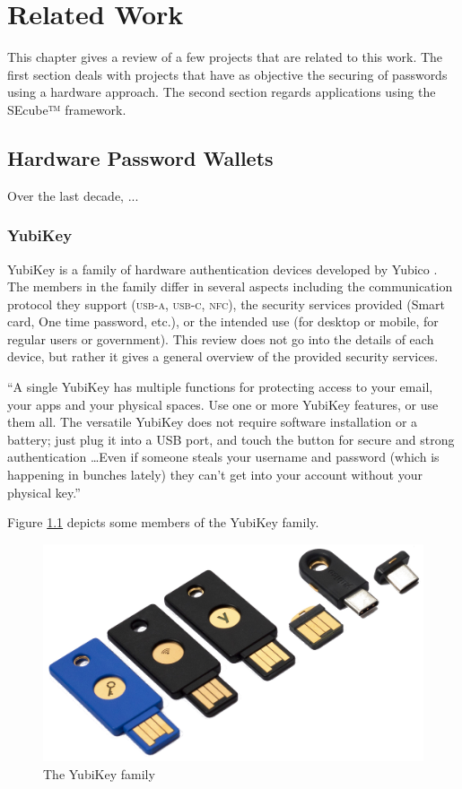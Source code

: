 \chapter{Related Work} \label{chap:related}

This chapter gives a review of a few projects that are related to this work. The first section deals with projects that have as objective the securing of passwords using a hardware approach. The second section regards applications using the SEcube™ framework.

\section {Hardware Password Wallets}
Over the last decade, ... 


\subsection{YubiKey}

YubiKey is a family of hardware authentication devices developed by Yubico \cite{yubi}. The members in the family differ in several aspects including the communication protocol they support (\textsc{usb-a}, \textsc{usb-c}, \textsc{nfc}), the security services provided (Smart card, One time password, etc.), or the intended use (for desktop or mobile, for regular users or government). This review does not go into the details of each device, but rather it gives a general overview of the provided security services. 

``A single YubiKey has multiple functions for protecting access to your email, your apps and your physical spaces. Use one or more YubiKey features, or use them all. The versatile YubiKey does not require software installation or a battery; just plug it into a USB port, and touch the button for secure and strong authentication \ldots  Even if someone steals your username and password (which is happening in bunches lately) they can’t get into your account without your physical key.''\cite{yubiworks}

Figure \ref{fig:yubi} depicts some members of the YubiKey family.

\begin{figure}[htb]
  \centering
  \captionsetup{justification=centering}
  \centerline{\includegraphics[width=0.8\columnwidth]{chapters/figures/related/yubikeyfam.jpg}}
  \caption{The YubiKey family}
  \label{fig:yubi}
\end{figure}

